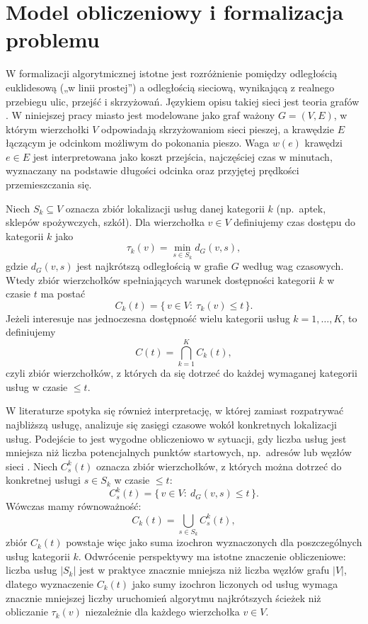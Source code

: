 \section{Model obliczeniowy i formalizacja problemu}
\label{sec:intro:formalizacja}

W formalizacji algorytmicznej istotne jest rozróżnienie pomiędzy odległością euklidesową
(„w linii prostej”) a odległością sieciową, wynikającą z realnego przebiegu ulic, przejść
i skrzyżowań. Językiem opisu takiej sieci jest teoria grafów \cite{barbieri2023graph}.
W niniejszej pracy miasto jest modelowane jako graf ważony $G=(V,E)$, w którym wierzchołki $V$
odpowiadają skrzyżowaniom sieci pieszej, a krawędzie $E$ łączącym je odcinkom możliwym do
pokonania pieszo. Waga $w(e)$ krawędzi $e\in E$ jest interpretowana jako koszt przejścia,
najczęściej czas w minutach, wyznaczany na podstawie długości odcinka oraz przyjętej prędkości
przemieszczania się.

Niech $S_k\subseteq V$ oznacza zbiór lokalizacji usług danej kategorii $k$
(np.\ aptek, sklepów spożywczych, szkół). Dla wierzchołka $v\in V$ definiujemy czas dostępu do kategorii $k$ jako
\[
\tau_k(v)=\min_{s\in S_k} d_G(v,s),
\]
gdzie $d_G(v,s)$ jest najkrótszą odległością w grafie $G$ według wag czasowych.
Wtedy zbiór wierzchołków spełniających warunek dostępności kategorii $k$ w czasie $t$ ma postać
\[
C_k(t)=\{\,v\in V:\ \tau_k(v)\le t\,\}.
\]
Jeżeli interesuje nas jednoczesna dostępność wielu kategorii usług $k=1,\dots,K$,
to definiujemy
\[
C(t)=\bigcap_{k=1}^{K} C_k(t),
\]
czyli zbiór wierzchołków, z których da się dotrzeć do każdej wymaganej kategorii usług w czasie $\le t$.

\clearpage

W literaturze spotyka się również interpretację, w której zamiast rozpatrywać najbliższą usługę,
analizuje się zasięgi czasowe wokół konkretnych lokalizacji usług.
Podejście to jest wygodne obliczeniowo w sytuacji, gdy liczba usług jest mniejsza
niż liczba potencjalnych punktów startowych, np.\ adresów lub węzłów sieci \cite{barbieri2023graph}.
Niech $C^k_s(t)$ oznacza zbiór wierzchołków, z których można dotrzeć do konkretnej usługi $s\in S_k$ w czasie $\le t$:
\[
C^k_s(t)=\{\,v\in V:\ d_G(v,s)\le t\,\}.
\]
Wówczas mamy równoważność:
\[
C_k(t)=\bigcup_{s\in S_k} C^k_s(t),
\]
zbiór $C_k(t)$ powstaje więc jako suma izochron wyznaczonych dla poszczególnych usług kategorii $k$.
Odwrócenie perspektywy ma istotne znaczenie obliczeniowe: liczba usług $|S_k|$ jest w praktyce
znacznie mniejsza niż liczba węzłów grafu $|V|$, dlatego wyznaczenie $C_k(t)$ jako sumy izochron
liczonych od usług wymaga znacznie mniejszej liczby uruchomień algorytmu najkrótszych ścieżek niż
obliczanie $\tau_k(v)$ niezależnie dla każdego wierzchołka $v\in V$.

